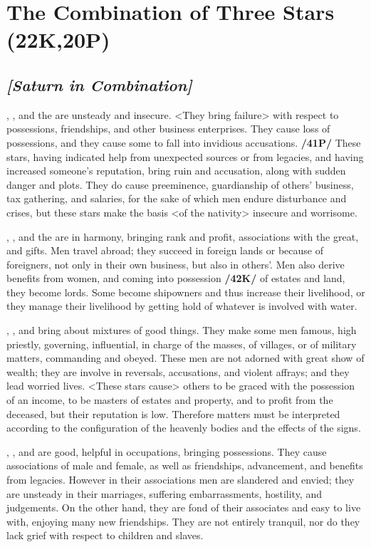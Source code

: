 \section{The Combination of Three Stars (22K,20P)}

\subsection{\textit{[Saturn in Combination]}}
\Saturn, \Jupiter, and the \Sun\xspace are unsteady and insecure. <They bring failure> with respect to possessions, friendships, and other business enterprises. They cause loss of possessions, and they cause some to fall into invidious accusations. \textbf{/41P/} These stars, having indicated help from unexpected sources or from legacies, and having increased someone’s reputation, bring ruin and accusation, along with sudden danger and plots. They do cause preeminence, guardianship of others’ business, tax gathering, and salaries, for the sake of which men endure disturbance and crises, but these stars make the basis <of the nativity> insecure and worrisome.

\Saturn, \Jupiter, and the \Moon\xspace are in harmony, bringing rank and profit, associations with the great, and gifts. Men travel abroad; they succeed in foreign lands or because of foreigners, not only in their own business, but also in others’. Men also derive benefits from women, and coming into possession \textbf{/42K/} of estates and land, they become lords. Some become shipowners and thus increase their livelihood, or they manage their livelihood by getting hold of whatever is involved with water.

\Saturn, \Jupiter, and \Mars\xspace bring about mixtures of good things. They make some men famous, high priestly,
governing, influential, in charge of the masses, of villages, or of military matters, commanding and obeyed. These men are not adorned with great show of wealth; they are involve in reversals, accusations, and violent affrays; and they lead worried lives. <These stars cause> others to be graced with the possession of an income, to be masters of estates and property, and to profit from the deceased, but their reputation is low. \mndl Therefore matters must be interpreted according to the configuration of the heavenly bodies and the effects of the signs.

\Saturn, \Jupiter, and \Venus\xspace are good, helpful in occupations, bringing possessions. They cause associations of male and female, as well as friendships, advancement, and benefits from legacies. However in their associations men are slandered and envied; they are unsteady in their marriages, suffering embarrassments, hostility, and judgements. On the other hand, they are fond of their associates and easy to
live with, enjoying many new friendships. They are not entirely tranquil, nor do they lack grief with respect to children and slaves.

